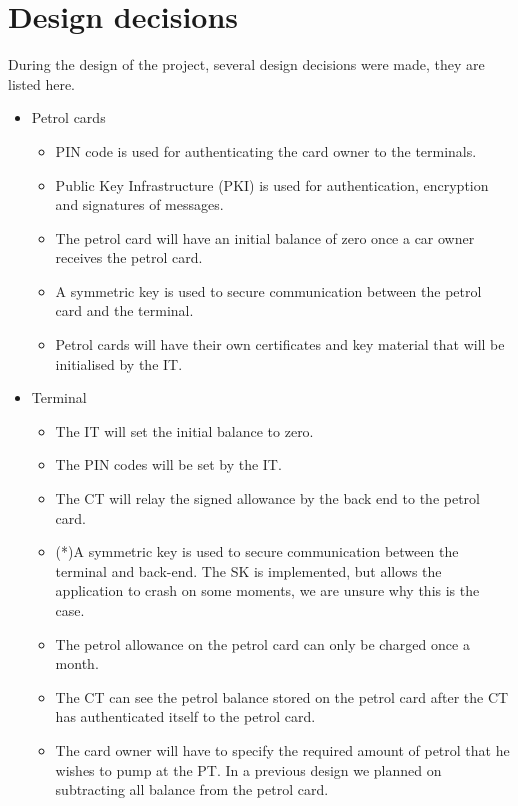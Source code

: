 \section{Design decisions}
During the design of the project, several design decisions were made, they are listed here.
\begin{itemize}
\item Petrol cards
\begin{itemize}
\item PIN code is used for authenticating the card owner to the terminals.
\item Public Key Infrastructure (PKI) is used for authentication, encryption and signatures of messages.
\item The petrol card will have an initial balance of zero once a car owner receives the petrol card. 
\item A symmetric key is used to secure communication between the petrol card and the terminal.
\item Petrol cards will have their own certificates and key material that will be initialised by the IT.
\end{itemize}

\item Terminal
\begin{itemize}
\item The IT will set the initial balance to zero.
\item The PIN codes will be set by the IT.
\item The CT will relay the signed allowance by the back end to the petrol card.
\item (*)A symmetric key is used to secure communication between the terminal and back-end. The SK is implemented, but allows the application to crash on some moments, we are unsure why this is the case. 
\item The petrol allowance on the petrol card can only be charged once a month.
\item The CT can see the petrol balance stored on the petrol card after the CT has authenticated itself to the petrol card.
\item The card owner will have to specify the required amount of petrol that he wishes to pump at the PT. In a previous design we planned on subtracting all balance from the petrol card. 
\end{itemize}



\end{itemize}
